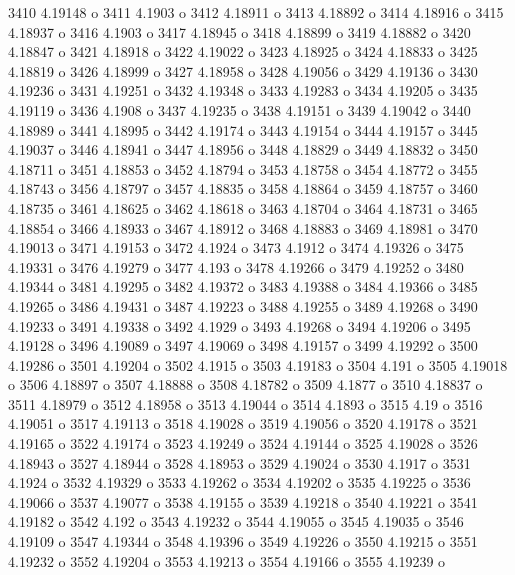  3410  4.19148  o
 3411  4.1903  o
 3412  4.18911  o
 3413  4.18892  o
 3414  4.18916  o
 3415  4.18937  o
 3416  4.1903  o
 3417  4.18945  o
 3418  4.18899  o
 3419  4.18882  o
 3420  4.18847  o
 3421  4.18918  o
 3422  4.19022  o
 3423  4.18925  o
 3424  4.18833  o
 3425  4.18819  o
 3426  4.18999  o
 3427  4.18958  o
 3428  4.19056  o
 3429  4.19136  o
 3430  4.19236  o
 3431  4.19251  o
 3432  4.19348  o
 3433  4.19283  o
 3434  4.19205  o
 3435  4.19119  o
 3436  4.1908  o
 3437  4.19235  o
 3438  4.19151  o
 3439  4.19042  o
 3440  4.18989  o
 3441  4.18995  o
 3442  4.19174  o
 3443  4.19154  o
 3444  4.19157  o
 3445  4.19037  o
 3446  4.18941  o
 3447  4.18956  o
 3448  4.18829  o
 3449  4.18832  o
 3450  4.18711  o
 3451  4.18853  o
 3452  4.18794  o
 3453  4.18758  o
 3454  4.18772  o
 3455  4.18743  o
 3456  4.18797  o
 3457  4.18835  o
 3458  4.18864  o
 3459  4.18757  o
 3460  4.18735  o
 3461  4.18625  o
 3462  4.18618  o
 3463  4.18704  o
 3464  4.18731  o
 3465  4.18854  o
 3466  4.18933  o
 3467  4.18912  o
 3468  4.18883  o
 3469  4.18981  o
 3470  4.19013  o
 3471  4.19153  o
 3472  4.1924  o
 3473  4.1912  o
 3474  4.19326  o
 3475  4.19331  o
 3476  4.19279  o
 3477  4.193  o
 3478  4.19266  o
 3479  4.19252  o
 3480  4.19344  o
 3481  4.19295  o
 3482  4.19372  o
 3483  4.19388  o
 3484  4.19366  o
 3485  4.19265  o
 3486  4.19431  o
 3487  4.19223  o
 3488  4.19255  o
 3489  4.19268  o
 3490  4.19233  o
 3491  4.19338  o
 3492  4.1929  o
 3493  4.19268  o
 3494  4.19206  o
 3495  4.19128  o
 3496  4.19089  o
 3497  4.19069  o
 3498  4.19157  o
 3499  4.19292  o
 3500  4.19286  o
 3501  4.19204  o
 3502  4.1915  o
 3503  4.19183  o
 3504  4.191  o
 3505  4.19018  o
 3506  4.18897  o
 3507  4.18888  o
 3508  4.18782  o
 3509  4.1877  o
 3510  4.18837  o
 3511  4.18979  o
 3512  4.18958  o
 3513  4.19044  o
 3514  4.1893  o
 3515  4.19  o
 3516  4.19051  o
 3517  4.19113  o
 3518  4.19028  o
 3519  4.19056  o
 3520  4.19178  o
 3521  4.19165  o
 3522  4.19174  o
 3523  4.19249  o
 3524  4.19144  o
 3525  4.19028  o
 3526  4.18943  o
 3527  4.18944  o
 3528  4.18953  o
 3529  4.19024  o
 3530  4.1917  o
 3531  4.1924  o
 3532  4.19329  o
 3533  4.19262  o
 3534  4.19202  o
 3535  4.19225  o
 3536  4.19066  o
 3537  4.19077  o
 3538  4.19155  o
 3539  4.19218  o
 3540  4.19221  o
 3541  4.19182  o
 3542  4.192  o
 3543  4.19232  o
 3544  4.19055  o
 3545  4.19035  o
 3546  4.19109  o
 3547  4.19344  o
 3548  4.19396  o
 3549  4.19226  o
 3550  4.19215  o
 3551  4.19232  o
 3552  4.19204  o
 3553  4.19213  o
 3554  4.19166  o
 3555  4.19239  o
